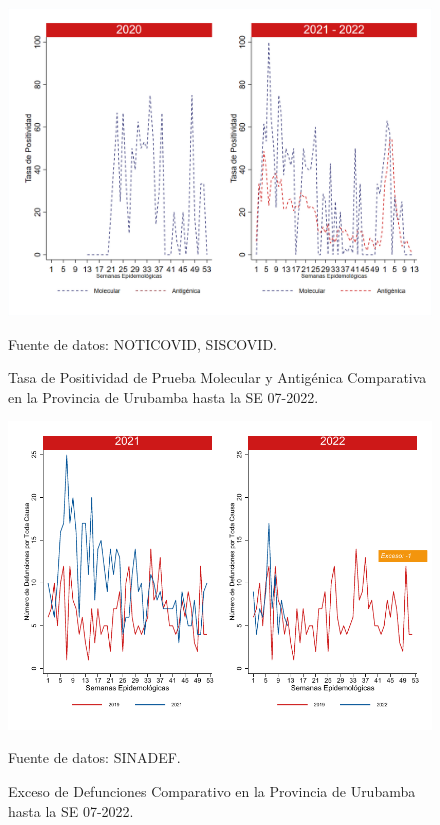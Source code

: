 \documentclass[12pt,a4paper,openany]{book}
\begin{document}
		\begin{figure}[h]
			\caption{Tasa de Positividad de Prueba Molecular y Antigénica Comparativa en la Provincia de Urubamba hasta la SE 07-2022.}\label{fig:positividad_urub}
			\begin{center}
				\includegraphics[width=0.7\linewidth]{../figuras/positividad_20_21_13.png}
			\end{center}
			{\footnotesize {Fuente de datos: NOTICOVID, SISCOVID.}}
		\end{figure}
		
		\begin{figure}[h]
			\caption{Exceso de Defunciones Comparativo en la Provincia de Urubamba hasta la SE 07-2022.}\label{fig:exceso_urub}
			\begin{center}
				\includegraphics[width=0.7\linewidth]{../figuras/exceso_13.pdf}
			\end{center}
			{\footnotesize {Fuente de datos: SINADEF.}}
		\end{figure}
		
		\clearpage
		
		\clearpage
		
\end{document}
